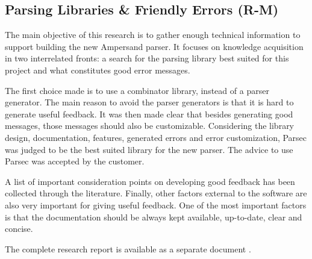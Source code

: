 

\subsection{Parsing Libraries \& Friendly Errors (R-M)}
The main objective of this research is to gather enough technical information to support building the new Ampersand parser.
It focuses on knowledge acquisition in two interrelated fronts: a search for the parsing library best suited for this project and what constitutes good error messages.

The first choice made is to use a combinator library, instead of a parser generator.
The main reason to avoid the parser generators is that it is hard to generate useful feedback.
It was then made clear that besides generating good messages, those messages should also be customizable.
Considering the library design, documentation, features, generated errors and error customization, Parsec was judged to be the best suited library for the new parser.
The advice to use Parsec was accepted by the customer.

A list of important consideration points on developing good feedback has been collected through the literature.
Finally, other factors external to the software are also very important for giving useful feedback.
One of the most important factors is that the documentation should be always kept available, up-to-date, clear and concise.

The complete research report is available as a separate document .
